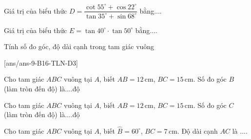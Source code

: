\begin{ex}%
	Giá trị của biểu thức $D=\dfrac{\cot 55^{\circ}+\cos 22^{\circ}}{\tan 35^{\circ}+\sin 68^{\circ}}$ bằng....
\end{ex}
\begin{ex}%
	Giá trị của biểu thức $E=\tan 40^{\circ} \cdot \tan 50^{\circ}$ bằng....
\end{ex}
\begin{dang}{Tính số đo góc, độ dài cạnh trong tam giác vuông}
\end{dang}
[ans/ans-9-B16-TLN-D3]
\begin{ex}%
	Cho tam giác $ABC$ vuông tại $A$, biết $AB=12\,\text{cm}$, $BC=15\,\text{cm}$. Số đo góc $B$ (làm tròn đến độ) là....độ
\end{ex}
\begin{ex}%
	Cho tam giác $ABC$ vuông tại $A$, biết $AB=12\,\text{cm}$, $BC=15\,\text{cm}$. Số đo góc $C$ (làm tròn đến độ) là....độ
\end{ex}
\begin{ex}%
	Cho tam giác $ABC$ vuông tại $A$, biết $\widehat{B}=60^{\circ}$, $BC=7\,\text{cm}$. Độ dài cạnh $AC$ là ....
\end{ex}
